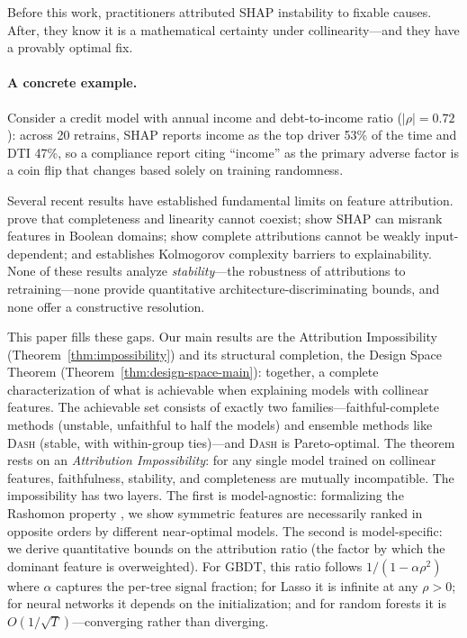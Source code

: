 \documentclass{article}
\newcommand{\DASH}{\textsc{Dash}}
\newcommand{\GBDT}{\textsc{GBDT}}
\begin{document}
Before this work, practitioners attributed SHAP instability to fixable causes. After, they know it is a mathematical certainty under collinearity---and they have a provably optimal fix.

\paragraph{A concrete example.}
Consider a credit model with annual income and debt-to-income ratio ($|\rho| = 0.72$): across 20 retrains, SHAP reports income as the top driver 53\% of the time and DTI 47\%, so a compliance report citing ``income'' as the primary adverse factor is a coin flip that changes based solely on training randomness.

Several recent results have established fundamental limits on feature attribution.
\citet{bilodeau2024impossibility} prove that completeness and linearity cannot coexist; \citet{huang2024failings} show SHAP can misrank features in Boolean domains; \citet{srinivas2019full} show complete attributions cannot be weakly input-dependent; and \citet{rao2025limits} establishes Kolmogorov complexity barriers to explainability.
None of these results analyze \emph{stability}---the robustness of attributions to retraining---none provide quantitative architecture-discriminating bounds, and none offer a constructive resolution.

This paper fills these gaps.
Our main results are the Attribution Impossibility (Theorem~\ref{thm:impossibility}) and its structural completion, the Design Space Theorem (Theorem~\ref{thm:design-space-main}): together, a complete characterization of what is achievable when explaining models with collinear features.
The achievable set consists of exactly two families---faithful-complete methods (unstable, unfaithful to half the models) and ensemble methods like \DASH{} (stable, with within-group ties)---and \DASH{} is Pareto-optimal.
The theorem rests on an \emph{Attribution Impossibility}: for any single model trained on collinear features, faithfulness, stability, and completeness are mutually incompatible.
The impossibility has two layers.
The first is model-agnostic: formalizing the Rashomon property \citep{rudin2024amazing}, we show symmetric features are necessarily ranked in opposite orders by different near-optimal models.
The second is model-specific: we derive quantitative bounds on the attribution ratio (the factor by which the dominant feature is overweighted).
For \GBDT{}, this ratio follows $1/(1-\alpha\rho^2)$ where $\alpha$ captures the per-tree signal fraction; for Lasso it is infinite at any $\rho > 0$; for neural networks it depends on the initialization; and for random forests it is $O(1/\sqrt{T})$---converging rather than diverging.
\end{document}
